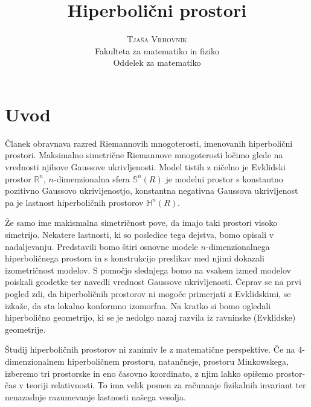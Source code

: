 \documentclass[a4paper]{article}
\begin{document}
\title{\Huge\textbf{Hiperbolični prostori}} 
\author{\large\textsc{Tjaša Vrhovnik}\\
	Fakulteta za matematiko in fiziko\\
	Oddelek za matematiko}

\thispagestyle{empty}

\maketitle

\newpage

\tableofcontents

\newpage

\section{Uvod}

Članek obravnava razred Riemannovih mnogoterosti, imenovanih hiperbolični prostori. Maksimalno simetrične Riemannove mnogoterosti ločimo glede na vrednosti njihove Gaussove ukrivljenosti. Model tistih z ničelno je Evklidski prostor $\mathbb{R}^{n}$, $n$-dimenzionalna sfera $\mathbb{S}^{n}(R)$ je modelni prostor s konstantno pozitivno Gaussovo ukrivljenostjo, konstantna negativna Gaussova ukrivljenost pa je lastnost hiperboličnih prostorov $\mathbb{H}^{n}(R)$.

Že samo ime makismalna simetričnost pove, da imajo taki prostori visoko simetrijo. Nekatere lastnosti, ki so posledice tega dejstva, bomo opisali v nadaljevanju. Predstavili bomo štiri osnovne modele $n$-dimenzionalnega hiperboličnega prostora in s konstrukcijo preslikav med njimi dokazali izometričnost modelov. S pomočjo slednjega bomo na vsakem izmed modelov poiskali geodetke ter navedli vrednost Gaussove ukrivljenosti. Čeprav se na prvi pogled zdi, da hiperboličnih prostorov ni mogoče primerjati z Evklidskimi, se izkaže, da sta lokalno konformno izomorfna. Na kratko si bomo ogledali hiperbolično geometrijo, ki se je nedolgo nazaj razvila iz ravninske (Evklidske) geometrije. 

Študij hiperboličnih prostorov ni zanimiv le z matematične perspektive. Če na $4$-dimenzionalnem hiperboličnem prostoru, natančneje, prostoru Minkowskega, izberemo tri prostorske in eno časovno koordinato, z njim lahko opišemo prostor-čas v teoriji relativnosti. To ima velik pomen za računanje fizikalnih invariant ter nenazadnje razumevanje lastnosti našega vesolja. 
\end{document}
